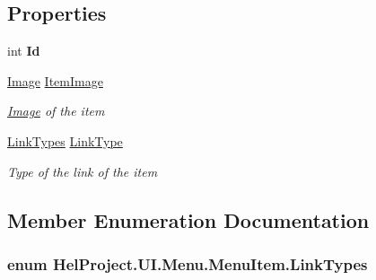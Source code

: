 \subsection*{Properties}
\begin{DoxyCompactItemize}
\item 
\hypertarget{class_hel_project_1_1_u_i_1_1_menu_1_1_menu_item_aa54732e7477c4e4da85bb7b0d7c607db}{}int {\bfseries Id}\label{class_hel_project_1_1_u_i_1_1_menu_1_1_menu_item_aa54732e7477c4e4da85bb7b0d7c607db}

\item 
\hyperlink{class_hel_project_1_1_u_i_1_1_image}{Image} \hyperlink{class_hel_project_1_1_u_i_1_1_menu_1_1_menu_item_aa233e38588bdc0878b378d84faf08d01}{Item\+Image}
\begin{DoxyCompactList}\small\item\em \hyperlink{class_hel_project_1_1_u_i_1_1_image}{Image} of the item \end{DoxyCompactList}\item 
\hyperlink{class_hel_project_1_1_u_i_1_1_menu_1_1_menu_item_aeb422f96ad792622197d81bea826c282}{Link\+Types} \hyperlink{class_hel_project_1_1_u_i_1_1_menu_1_1_menu_item_a4973403225833802c1e4409b5eaf2be3}{Link\+Type}
\begin{DoxyCompactList}\small\item\em Type of the link of the item \end{DoxyCompactList}\end{DoxyCompactItemize}


\subsection{Member Enumeration Documentation}
\hypertarget{class_hel_project_1_1_u_i_1_1_menu_1_1_menu_item_aeb422f96ad792622197d81bea826c282}{}
\subsubsection[{Link\+Types}]{\setlength{\rightskip}{0pt plus 5cm}enum {\bf Hel\+Project.\+U\+I.\+Menu.\+Menu\+Item.\+Link\+Types}}\label{class_hel_project_1_1_u_i_1_1_menu_1_1_menu_item_aeb422f96ad792622197d81bea826c282}


